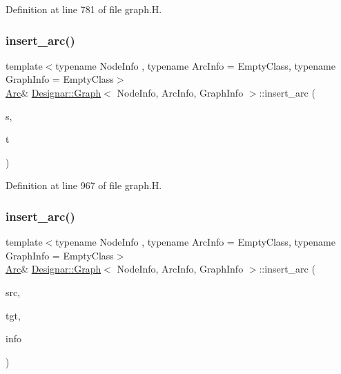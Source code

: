Definition at line 781 of file graph.\+H.

\mbox{\label{class_designar_1_1_graph_a794e687e21db6f4e00e14c6bdc5c2907}} 
\subsubsection{\texorpdfstring{insert\+\_\+arc()}{insert\_arc()}\hspace{0.1cm}{\footnotesize\ttfamily [2/4]}}
{\footnotesize\ttfamily template$<$typename Node\+Info , typename Arc\+Info  = Empty\+Class, typename Graph\+Info  = Empty\+Class$>$ \\
\hyperlink{class_designar_1_1_graph_a74c730ef4ce2d20f998d72bd25c2b5bf}{Arc}\& \hyperlink{class_designar_1_1_graph}{Designar\+::\+Graph}$<$ Node\+Info, Arc\+Info, Graph\+Info $>$\+::insert\+\_\+arc (\begin{DoxyParamCaption}\item[{\hyperlink{class_designar_1_1_graph_a5dfc7dba9d092ac489c72e40390c37d0}{Node} \&}]{s,  }\item[{\hyperlink{class_designar_1_1_graph_a5dfc7dba9d092ac489c72e40390c37d0}{Node} \&}]{t }\end{DoxyParamCaption})\hspace{0.3cm}{\ttfamily [inline]}}



Definition at line 967 of file graph.\+H.

\mbox{\label{class_designar_1_1_graph_ad310a106f10d0a7ff12915d8b47e8e3d}} 
\subsubsection{\texorpdfstring{insert\+\_\+arc()}{insert\_arc()}\hspace{0.1cm}{\footnotesize\ttfamily [3/4]}}
{\footnotesize\ttfamily template$<$typename Node\+Info , typename Arc\+Info  = Empty\+Class, typename Graph\+Info  = Empty\+Class$>$ \\
\hyperlink{class_designar_1_1_graph_a74c730ef4ce2d20f998d72bd25c2b5bf}{Arc}\& \hyperlink{class_designar_1_1_graph}{Designar\+::\+Graph}$<$ Node\+Info, Arc\+Info, Graph\+Info $>$\+::insert\+\_\+arc (\begin{DoxyParamCaption}\item[{\hyperlink{class_designar_1_1_graph_a5dfc7dba9d092ac489c72e40390c37d0}{Node} \&}]{src,  }\item[{\hyperlink{class_designar_1_1_graph_a5dfc7dba9d092ac489c72e40390c37d0}{Node} \&}]{tgt,  }\item[{const Arc\+Info \&}]{info }\end{DoxyParamCaption})\hspace{0.3cm}{\ttfamily [inline]}}



